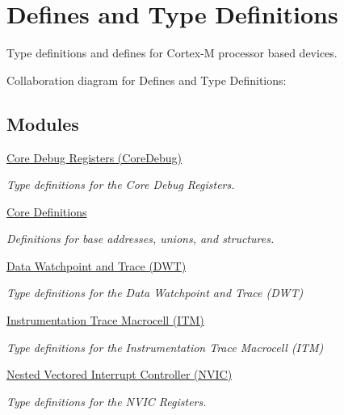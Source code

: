 \hypertarget{group__CMSIS__core__register}{}\section{Defines and Type Definitions}
\label{group__CMSIS__core__register}


Type definitions and defines for Cortex-\/M processor based devices.  


Collaboration diagram for Defines and Type Definitions\+:
\subsection*{Modules}
\begin{DoxyCompactItemize}
\item 
\hyperlink{group__CMSIS__CoreDebug}{Core Debug Registers (\+Core\+Debug)}
\begin{DoxyCompactList}\small\item\em Type definitions for the Core Debug Registers. \end{DoxyCompactList}\item 
\hyperlink{group__CMSIS__core__base}{Core Definitions}
\begin{DoxyCompactList}\small\item\em Definitions for base addresses, unions, and structures. \end{DoxyCompactList}\item 
\hyperlink{group__CMSIS__DWT}{Data Watchpoint and Trace (\+D\+W\+T)}
\begin{DoxyCompactList}\small\item\em Type definitions for the Data Watchpoint and Trace (D\+WT) \end{DoxyCompactList}\item 
\hyperlink{group__CMSIS__ITM}{Instrumentation Trace Macrocell (\+I\+T\+M)}
\begin{DoxyCompactList}\small\item\em Type definitions for the Instrumentation Trace Macrocell (I\+TM) \end{DoxyCompactList}\item 
\hyperlink{group__CMSIS__NVIC}{Nested Vectored Interrupt Controller (\+N\+V\+I\+C)}
\begin{DoxyCompactList}\small\item\em Type definitions for the N\+V\+IC Registers. \end{DoxyCompactList}\item 

\end{DoxyCompactItemize}
